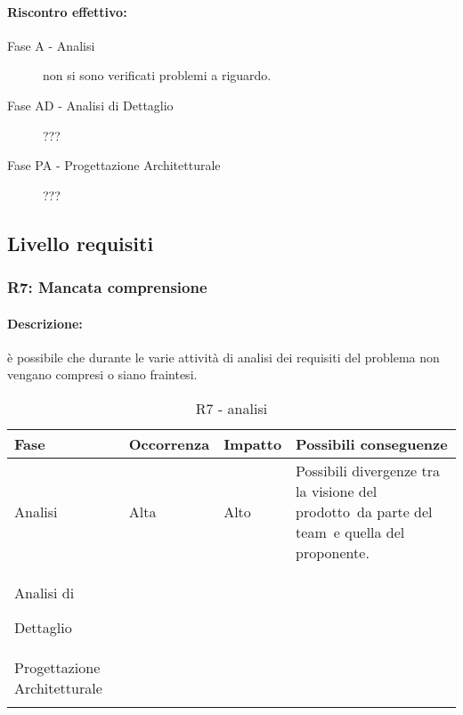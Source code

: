 \documentclass[../PianoProgetto.tex]{subfiles}
\begin{document}
	\paragraph*{Riscontro effettivo:}
		\begin{description}
			\item[Fase A - Analisi] non si sono verificati problemi a riguardo.
			\item[Fase AD - Analisi di Dettaglio] ???
			\item[Fase PA - Progettazione Architetturale] ???
		\end{description}

\subsection{Livello requisiti}

\subsubsection{R7: Mancata comprensione}

	\paragraph*{Descrizione:} è possibile che durante le varie attività di analisi dei requisiti del problema non vengano compresi o siano fraintesi.
	
	
	\begin{table}[h]
		\centering
		\begin{tabularx}{\textwidth}{F O O P}
			\toprule
			\textbf{Fase} & \textbf{Occorrenza} & \textbf{Impatto} & \textbf{Possibili conseguenze}\\
			\midrule
			Analisi & Alta & Alto & Possibili divergenze tra la visione del prodotto\g\ da parte del team\g\ e quella del proponente. \\
			\midrule
			Analisi di \par Dettaglio & & & \\
			\midrule
			Progettazione Architetturale & & & \\
			\bottomrule
		\end{tabularx}
		\caption{R7 - analisi}
		\label{tab:R7-analisi}	
	\end{table}
		
\end{document}
